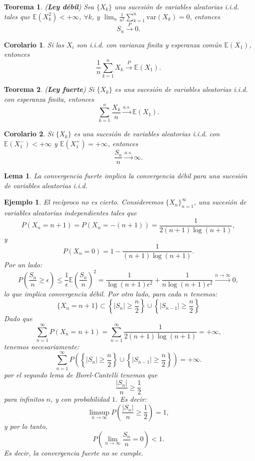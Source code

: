 \documentclass{report}
\newtheorem{thm}{Teorema}[section]
\newtheorem{lem}{Lema}[section]
\newtheorem{cor}{Corolario}[thm]
\newtheorem{ej}{Ejemplo}[section]
\begin{document}
\begin{thm} \label{thm:ley_debil} (\textbf{Ley débil}) Sea $\{X_k\}$ una sucesión de variables aleatorias i.i.d.
    tales que $\mathbb{E}(X_k^2) < +\infty$, $\forall k$, y $\lim_n \frac{1}{n^2} \sum_{k=1}^n \mathrm{var}(X_k) = 0$, entonces
\[
S_n \xrightarrow{P} 0.
\]
\end{thm}

\begin{cor}
Si las \( X_i \) son \emph{i.i.d.} con varianza finita y esperanza común \( \mathbb{E}(X_1) \), entonces
\[
\frac{1}{n} \sum_{k=1}^n X_k \xrightarrow{P} \mathbb{E}(X_1).
\]
\end{cor}


\begin{thm} \label{thm:ley_fuerte} (\textbf{Ley fuerte}) Si $\{X_k\}$ es una sucesión de variables aleatorias i.i.d. con esperanza finita, entonces
\[
\sum_{k=1}^n \frac{X_k}{n} \xrightarrow{a.s.} \mathbb{E}(X_1).
\]
\end{thm}


\begin{cor} \label{cor:divergence_positive_infinite_mean}
Si $\{X_k\}$ es una sucesión de variables aleatorias i.i.d. con $\mathbb{E}(X_1^-) < +\infty$ y $\mathbb{E}(X_1^+) = +\infty$,
entonces $$\frac{S_n}{n} \xrightarrow{a.s.} \infty.$$
\end{cor}

\begin{lem}
    La convergencia fuerte implica la convergencia débil para una sucesión de variables aleatorias i.i.d.    
\end{lem}

\begin{ej}
El recíproco no es cierto. Consideremos \( \{X_n\}_{n=1}^\infty \), una sucesión de variables aleatorias independientes tales que
\[
P(X_n = n+1) = P(X_n = -(n+1)) = \frac{1}{2(n+1)\log(n+1)},
\]
y
\[
P(X_n = 0) = 1 - \frac{1}{(n+1)\log(n+1)}.
\] 
Por un lado:
$$
P\left(\frac{S_n}{n}\geq \epsilon\right) \leq \frac{1}{\epsilon}\mathbb{E}\left(\frac{S_n}{n}\right)^2 = 
\frac{1}{\log(n+1)\epsilon^2}+\frac{1}{n\log(n+1)\epsilon^2} \xrightarrow{n\rightarrow\infty} 0,
$$
lo que implica convergencia débil. Por otro lado, para cada $n$ tenemos:
$$
\{X_n = n+1\} \subset \left\{ |S_n|\geq \frac{n}{2} \right\} \cup \left\{ |S_{n-1}|\geq \frac{n}{2} \right\} 
$$
Dado que
\[
\sum_{n=1}^{\infty} P(X_n = n+1) = \sum_{n=1}^{\infty} \frac{1}{2(n+1)\log(n+1)} = +\infty,
\]
tenemos necesariamente:
\[
\sum_{n=1}^{\infty} P\left(\left\{ |S_n|\geq \frac{n}{2} \right\} \cup \left\{ |S_{n-1}|\geq \frac{n}{2} \right\} \right)  = +\infty.
\]
por el segundo lema de Borel-Cantelli tenemos que 
\[
\frac{|S_n|}{n}\geq \frac{1}{2}
\]
para infinitos $n$, y con probabilidad $1$. Es decir:
\[
\limsup_{n \to \infty} P \left( \frac{|S_n|}{n} \geq \frac{1}{2} \right) = 1,
\]
y por lo tanto,
\[
P \left( \lim_{n \to \infty} \frac{S_n}{n} = 0 \right) < 1.
\]
Es decir, la convergencia fuerte no se cumple.
\end{ej}
\end{document}
